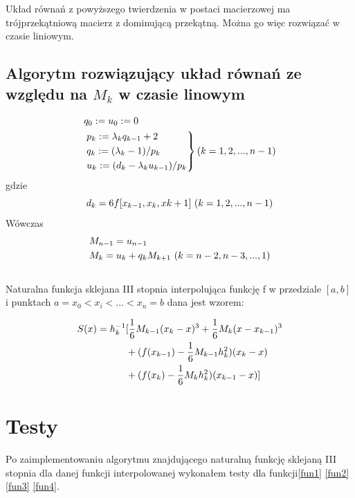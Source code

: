 \documentclass{article}
\begin{document}
Układ równań z powyższego twierdzenia w postaci macierzowej ma trójprzekątniową macierz z dominującą przekątną. Można go więc rozwiązać w czasie liniowym.

\subsection{Algorytm rozwiązujący układ równań ze względu na $M_k$ w czasie linowym}

\begin{align}
	&q_0 := u_0 := 0 \\
	\notag
	&\begin{rcases}
		p_k := \lambda_k q_{k-1} + 2 \\ \notag
		q_k := (\lambda_k - 1) / p_k \\ \notag
		u_k := (d_k -\lambda_k u_{k-1}) / p_k
	\end{rcases}
	\text{$(k=1,2,...,n-1)$}
\end{align}
gdzie
\begin{equation*}
	d_k = 6 f[x_{k-1},x_k,x{k+1}] \textnormal{ } (k=1,2,...,n-1)
\end{equation*}
Wówczas
\begin{align*}
	&M_{n-1} = u_{n-1} \\ \notag
	&M_k = u_k + q_k M_{k+1} \textnormal{ } (k =n-2,n-3,...,1 )
\end{align*}
\\

\noindent Naturalna funkcja sklejana III stopnia interpolująca funkcję f w przedziale $[a,b]$ i punktach $a = x_0 < x_i <...<x_n = b$ dana jest wzorem:

\begin{align}
	S(x) = h_{k}^{-1}&[\frac{1}{6} M_{k-1}(x_k - x)^3  
					 +\frac{1}{6} M_k (x - x_{k-1})^3 \\
					 \notag
					 &+(f(x_{k-1}) - \frac{1}{6} M_{k-1} h_{k}^2) (x_k -x ) \\
					 \notag
					 &+(f(x_{k}) - \frac{1}{6} M_{k} h_{k}^2) (x_{k-1} -x )]
\end{align}


\section{Testy}
Po zaimplementowaniu algorytmu znajdującego naturalną funkcję sklejaną III stopnia dla danej funkcji interpolowanej wykonałem testy dla funkcji\eqref{fun1} \eqref{fun2} \eqref{fun3} \eqref{fun4}.
\end{document}
